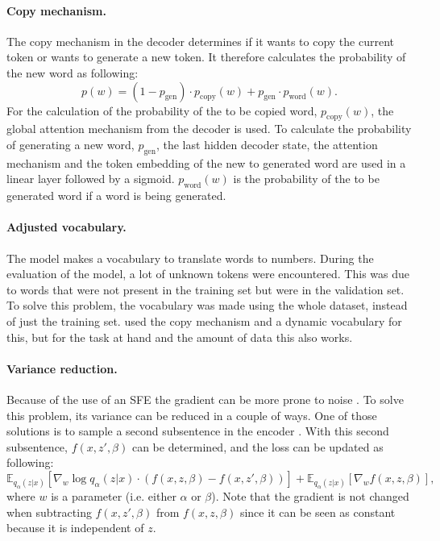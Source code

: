 \paragraph{Copy mechanism.} The copy mechanism  in the decoder determines if it wants to copy the current token or wants to generate a new token. 
It therefore calculates the probability of the new word as following:
\begin{equation}
    p(w) = (1 - p_{\text{gen}}) \cdot p_{\text{copy}}(w) + p_{\text{gen}} \cdot p_{\text{word}}(w).
\end{equation}
For the calculation of the probability of the to be copied word, $p_{\text{copy}}(w)$, the global attention mechanism from the decoder is used. 
To calculate the probability of generating a new word, $p_{\text{gen}}$, the last hidden decoder state, the attention mechanism and the token embedding of the new to generated word are used in a linear layer followed by a sigmoid.
$p_{\text{word}}(w)$ is the probability of the to be generated word if a word is being generated. 

\paragraph{Adjusted vocabulary.} The model makes a vocabulary to translate words to numbers. 
During the evaluation of the model, a lot of unknown tokens were encountered.
This was due to words that were not present in the training set but were in the validation set. 
To solve this problem, the vocabulary was made using the whole dataset, instead of just the training set. 
 used the copy mechanism and a dynamic vocabulary for this, but for the task at hand and the amount of data this also works.

\paragraph{Variance reduction.} Because of the use of an SFE the gradient can be more prone to noise .
To solve this problem, its variance can be reduced in a couple of ways. 
One of those solutions is to sample a second subsentence in the encoder . 
With this second subsentence, $f(x, z', \beta)$ can be determined, and the loss can be updated as following:
\begin{equation}
    \mathbb{E}_{q_{\alpha}(z|x)} [\nabla_w \log q_{\alpha}(z|x) \cdot (f(x, z, \beta)-f(x, z', \beta))] + \mathbb{E}_{q_{\alpha}(z|x)} [\nabla_w f(x, z, \beta)],
\end{equation}
where $w$ is a parameter (i.e. either $\alpha$ or $\beta$). Note that the gradient is not changed when subtracting $f(x, z', \beta)$ from $f(x, z, \beta)$ since it can be seen as constant because it is independent of $z$.
